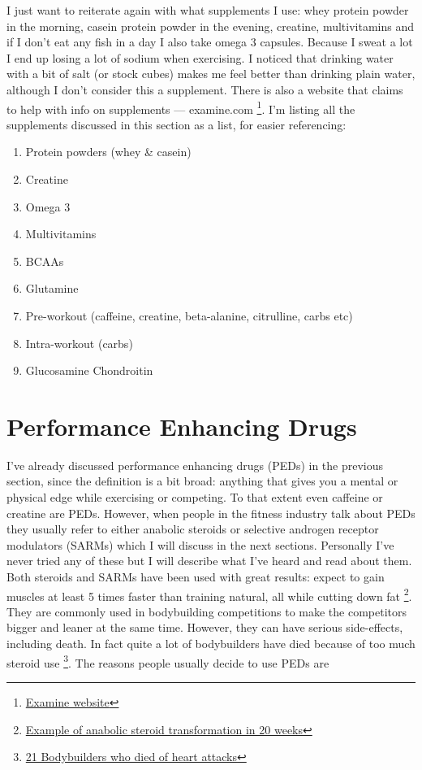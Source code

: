 \documentclass[openany, 12pt]{book}
\begin{document}
        I just want to reiterate again with what supplements I use: whey protein powder in the morning, casein protein powder in the evening, creatine, multivitamins and if I don't eat any fish
        in a day I also take omega 3 capsules. Because I sweat a lot I end up
        losing a lot of sodium when exercising. I noticed that drinking water with a bit of salt (or stock cubes) makes me feel better
        than drinking plain water, although I don't consider this a supplement. There is also a website that claims to help with info on supplements --- examine.com
        \footnote{\href{https://examine.com/}{Examine website}}.
        I'm listing all the supplements discussed in this section as a list, for easier referencing:

	\begin{enumerate}
		\item Protein powders (whey \& casein)
		\item Creatine
		\item Omega 3
		\item Multivitamins
		\item BCAAs
		\item Glutamine
		\item Pre-workout (caffeine, creatine, beta-alanine, citrulline, carbs etc)
		\item Intra-workout (carbs)
		\item Glucosamine Chondroitin
	\end{enumerate}

        \section{Performance Enhancing Drugs}

        I've already discussed performance enhancing drugs (PEDs) in the previous section, since the definition is a bit broad: anything that gives you a mental or physical edge while exercising or
        competing. To that extent even caffeine or creatine are PEDs. However, when people in the fitness industry talk about PEDs they usually refer to either anabolic steroids or selective androgen
        receptor modulators (SARMs) which I will discuss in the next sections. Personally I've never tried any of these but I will describe what I've heard and read about them.
        Both steroids and SARMs have been used with great results: expect to gain muscles at least 5 times faster than training natural, all while cutting down fat
        \footnote{\href{https://www.reddit.com/r/nattyorjuice/comments/c0mak1/physique_before_usage_of_the_steroids_is/}{Example of anabolic steroid transformation in 20 weeks}}.
        They are commonly used in bodybuilding competitions to make the competitors bigger and leaner at the same time. However, they can have serious side-effects, including death. In fact quite a lot
        of bodybuilders have died because of too much steroid use
        \footnote{\href{https://fitnessvolt.com/bodybuilder-deaths-heart-attack/}{21 Bodybuilders who died of heart attacks}}.
        The reasons people usually decide to use PEDs are
\end{document}

